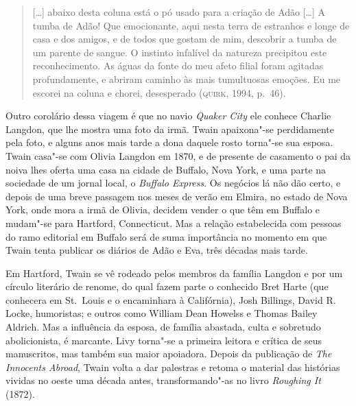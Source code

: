 \begin{quote}
[\ldots{}] abaixo desta coluna está o pó usado para a criação de Adão [\ldots{}] A
tumba de Adão! Que emocionante, aqui nesta terra de estranhos e longe de
casa e dos amigos, e de todos que gostam de mim, descobrir a tumba de um
parente de sangue. O instinto infalível da natureza precipitou este
reconhecimento. As águas da fonte do meu afeto filial foram agitadas
profundamente, e abriram caminho às mais tumultuosas emoções. Eu me
escorei na coluna e chorei, desesperado (\textsc{quirk}, 1994, p.~46). 
\end{quote}

Outro corolário dessa viagem é que no navio \textit{Quaker City} ele conhece Charlie
Langdon, que lhe mostra uma foto da irmã. Twain apaixona"-se perdidamente pela
foto, e alguns anos mais tarde a dona daquele rosto torna"-se sua esposa.
Twain casa"-se com Olivia Langdon em 1870, e de presente de casamento o pai
da noiva lhes oferta uma casa na cidade de Buffalo, Nova York, e uma parte
na sociedade de um jornal local, o \textit{Buffalo Express}. Os negócios
lá não dão certo, e depois de uma breve passagem nos meses de verão em
Elmira, no estado de Nova York, onde mora a irmã de Olivia, decidem
vender o que têm em Buffalo e mudam"-se para Hartford, Connecticut. Mas a
relação estabelecida com pessoas do ramo editorial em Buffalo será de suma importância
no momento em que Twain tenta publicar os diários de Adão e Eva, três
décadas mais tarde.

Em Hartford, Twain se vê rodeado pelos membros da família Langdon e por
um círculo literário de renome, do qual fazem parte o conhecido Bret Harte (que
conhecera em St.~Louis e o encaminhara à Califórnia), Josh Billings, David R.
Locke, humoristas; e outros como William Dean Howelss e Thomas Bailey
Aldrich. Mas a influência da esposa, de família abastada, culta
e sobretudo abolicionista, é marcante. Livy torna"-se a primeira leitora
e crítica de seus manuscritos, mas também sua maior apoiadora. Depois da
publicação de \textit{The Innocents Abroad}, Twain volta a dar palestras e
retoma o material das histórias vividas no oeste uma década antes,
transformando"-as no livro \textit{Roughing It} (1872).

